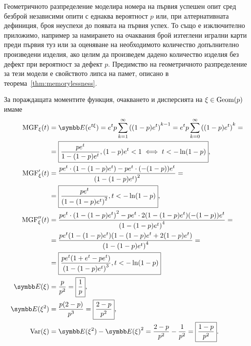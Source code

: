\documentclass[numbers=endperiod, bibliography=totocnumbered]{scrartcl}
\begin{document}
Геометричното разпределение моделира номера на първия успешен опит сред безброй независими опити с еднаква вероятност \( p \) или, при алтернативната дефиниция, броя неуспехи до появата на първия успех. То също е изключително приложимо, например за намирането на очаквания брой изтеглени игрални карти преди първия туз или за оценяване на необходимото количество допълнително произведени изделия, ако целим да произведем дадено количество изделия без дефект при вероятност за дефект \( p \). Предимство на геометричното разпределение за тези модели е свойството липса на памет, описано в теорема~\ref{thm:memorylessness}.

За пораждащата моментите функция, очакването и дисперсията на \( \xi \in \operatorname{Geom}(p) \) имаме
\begingroup
\allowdisplaybreaks
\begin{align*}
  \MGF_\xi(t)
  &=
  \Expect(e^{t\xi})
  =
  e^t p \sum_{k=1}^\infty {((1-p) e^t)}^{k-1}
  =
  e^t p \sum_{k=0}^\infty {((1-p) e^t)}^k
  = \\ &=
  \boxed{\frac {p e^t} {1 - (1-p) e^t}, (1-p) e^t < 1 \iff t < -\ln(1-p)},
  \\
  \MGF'_\xi(t)
  &=
  \frac {p e^t \cdot (1 - (1-p) e^t) - p e^t \cdot (-(1-p)) e^t} {{(1 - (1-p) e^t)}^2}
  = \\ &=
  \boxed{\frac {p e^t} {{(1 - (1-p) e^t)}^2}, t < -\ln(1-p)},
  \\
  \MGF''_\xi(t)
  &=
  \frac {p e^t \cdot {(1 - (1-p) e^t)}^2 - p e^t \cdot 2 (1 - (1-p) e^t) (-(1-p)) e^t} {{(1 - (1-p) e^t)}^4}
  = \\ &=
  \frac {p e^t (1 - (1-p) e^t) (1 - (1-p) e^t + 2 (1-p) e^t)} {{(1 - (1-p) e^t)}^4}
  = \\ &=
  \boxed{\frac {p e^t (1 + e^t - p e^t)} {{(1 - (1-p) e^t)}^3}, t < -\ln(1-p)}
  \\
  \Expect(\xi)
  &=
  \frac p {p^2}
  =
  \boxed{\frac 1 p},
  \\
  \Expect(\xi^2)
  &=
  \frac {p(2-p)} {p^3}
  =
  \boxed{\frac {2-p} {p^2}},
  \\
  \Var(\xi)
  &=
  \Expect(\xi^2) - {\Expect(\xi)}^2
  =
  \frac {2-p} {p^2} - \frac 1 {p^2}
  =
  \boxed{\frac {1-p} {p^2}}.
\end{align*}
\endgroup
\end{document}
